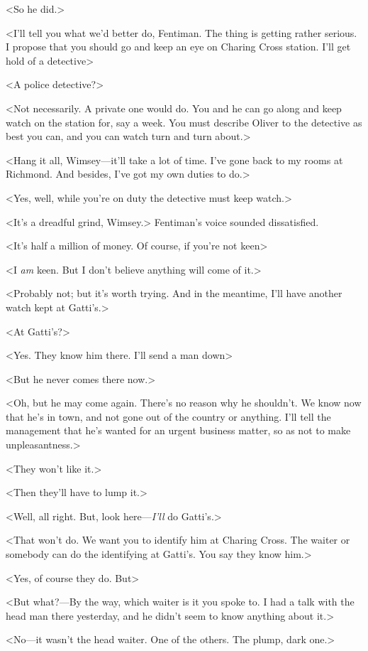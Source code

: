 <So he did.>

<I'll tell you what we'd better do, Fentiman. The thing is getting rather serious. I propose that you should go and keep an eye on Charing Cross station. I'll get hold of a detective\longdash>

<A police detective?>

<Not necessarily. A private one would do. You and he can go along and keep watch on the station for, say a week. You must describe Oliver to the detective as best you can, and you can watch turn and turn about.>

<Hang it all, Wimsey—it'll take a lot of time. I've gone back to my rooms at Richmond. And besides, I've got my own duties to do.>

<Yes, well, while you're on duty the detective must keep watch.>

<It's a dreadful grind, Wimsey.> Fentiman's voice sounded dissatisfied.

<It's half a million of money. Of course, if you're not keen\longdash>

<I \emph{am} keen. But I don't believe anything will come of it.>

<Probably not; but it's worth trying. And in the meantime, I'll have another watch kept at Gatti's.>

<At Gatti's?>

<Yes. They know him there. I'll send a man down\longdash>

<But he never comes there now.>

<Oh, but he may come again. There's no reason why he shouldn't. We know now that he's in town, and not gone out of the country or anything. I'll tell the management that he's wanted for an urgent business matter, so as not to make unpleasantness.>

<They won't like it.>

<Then they'll have to lump it.>

<Well, all right. But, look here—\emph{I'll} do Gatti's.>

<That won't do. We want you to identify him at Charing Cross. The waiter or somebody can do the identifying at Gatti's. You say they know him.>

<Yes, of course they do. But\longdash>

<But what?—By the way, which waiter is it you spoke to. I had a talk with the head man there yesterday, and he didn't seem to know anything about it.>

<No—it wasn't the head waiter. One of the others. The plump, dark one.>

